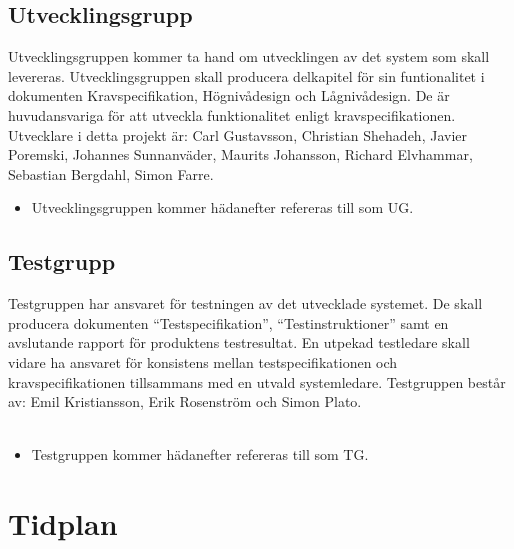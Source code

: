 \documentclass[paper=a4, fontsize=11pt,twoside]{article}
\begin{document}
\subsection*{Utvecklingsgrupp}
Utvecklingsgruppen kommer ta hand om utvecklingen av det system som skall levereras. Utvecklingsgruppen skall producera delkapitel för sin funtionalitet i dokumenten Kravspecifikation, Högnivådesign och Lågnivådesign. De är huvudansvariga för att utveckla funktionalitet enligt kravspecifikationen. Utvecklare i detta projekt är: Carl Gustavsson, Christian Shehadeh, Javier Poremski, Johannes Sunnanväder, Maurits Johansson, Richard Elvhammar, Sebastian Bergdahl, Simon Farre. \\
{\color{red}{------Unit-testa sin egen kod. }}
\begin{itemize}
\item Utvecklingsgruppen kommer hädanefter refereras till som UG.
\end{itemize}

\subsection*{Testgrupp}
Testgruppen har ansvaret för testningen av det utvecklade systemet. De skall producera dokumenten ``Testspecifikation'', ``Testinstruktioner'' samt en avslutande rapport för produktens testresultat. En utpekad testledare skall vidare ha ansvaret för konsistens mellan testspecifikationen och kravspecifikationen tillsammans med en utvald systemledare. Testgruppen består av: Emil Kristiansson, Erik Rosenström och Simon Plato.\\
{\color{red}{--------Producera monitorfiler för alla funktionstest (?)}}\\
{\color{red}{-------Föra versionshanterig av en massa appendix???}}
\begin{itemize}
\item  Testgruppen kommer hädanefter refereras till som TG.
\end{itemize}

\section{Tidplan}
\end{document}
